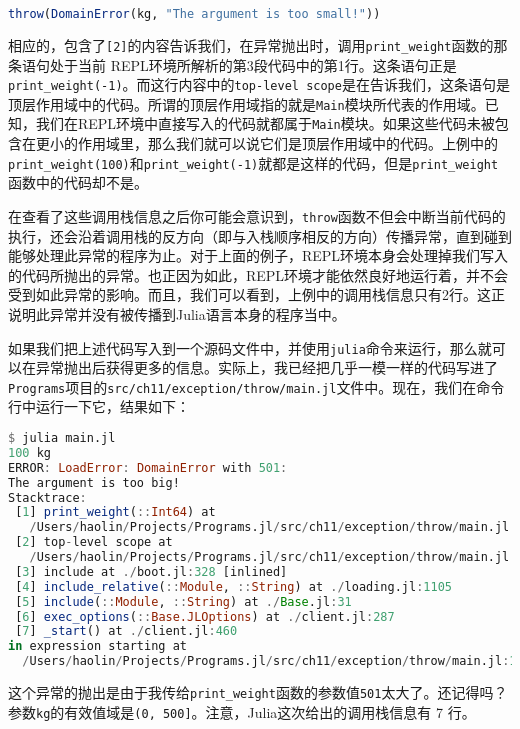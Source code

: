 \begin{lstlisting}[language=julia]
throw(DomainError(kg, "The argument is too small!"))
\end{lstlisting}

相应的，包含了\verb`[2]`的内容告诉我们，在异常抛出时，调用\verb`print_weight`函数的那条语句处于当前 REPL环境所解析的第3段代码中的第1行。这条语句正是\verb`print_weight(-1)`。而这行内容中的\verb`top-level scope`是在告诉我们，这条语句是顶层作用域中的代码。所谓的顶层作用域指的就是\verb`Main`模块所代表的作用域。已知，我们在REPL环境中直接写入的代码就都属于\verb`Main`模块。如果这些代码未被包含在更小的作用域里，那么我们就可以说它们是顶层作用域中的代码。上例中的\verb`print_weight(100)`和\verb`print_weight(-1)`就都是这样的代码，但是\verb`print_weight`函数中的代码却不是。

在查看了这些调用栈信息之后你可能会意识到，\verb`throw`函数不但会中断当前代码的执行，还会沿着调用栈的反方向（即与入栈顺序相反的方向）传播异常，直到碰到能够处理此异常的程序为止。对于上面的例子，REPL环境本身会处理掉我们写入的代码所抛出的异常。也正因为如此，REPL环境才能依然良好地运行着，并不会受到如此异常的影响。而且，我们可以看到，上例中的调用栈信息只有2行。这正说明此异常并没有被传播到Julia语言本身的程序当中。

如果我们把上述代码写入到一个源码文件中，并使用\verb`julia`命令来运行，那么就可以在异常抛出后获得更多的信息。实际上，我已经把几乎一模一样的代码写进了\verb`Programs`项目的\verb`src/ch11/exception/throw/main.jl`文件中。现在，我们在命令行中运行一下它，结果如下：

\begin{lstlisting}[language=julia]
$ julia main.jl 
100 kg
ERROR: LoadError: DomainError with 501:
The argument is too big!
Stacktrace:
 [1] print_weight(::Int64) at 
   /Users/haolin/Projects/Programs.jl/src/ch11/exception/throw/main.jl:11
 [2] top-level scope at 
   /Users/haolin/Projects/Programs.jl/src/ch11/exception/throw/main.jl:17
 [3] include at ./boot.jl:328 [inlined]
 [4] include_relative(::Module, ::String) at ./loading.jl:1105
 [5] include(::Module, ::String) at ./Base.jl:31
 [6] exec_options(::Base.JLOptions) at ./client.jl:287
 [7] _start() at ./client.jl:460
in expression starting at 
  /Users/haolin/Projects/Programs.jl/src/ch11/exception/throw/main.jl:17
\end{lstlisting}

这个异常的抛出是由于我传给\verb`print_weight`函数的参数值\verb`501`太大了。还记得吗？参数\verb`kg`的有效值域是\verb`(0, 500]`。注意，Julia这次给出的调用栈信息有 7 行。

